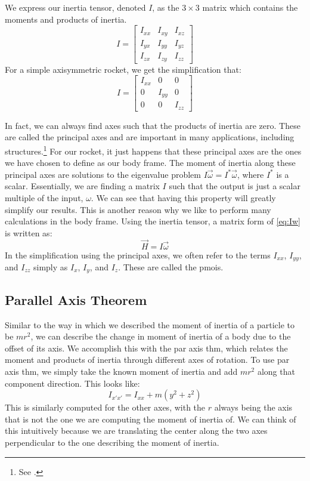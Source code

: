 \documentclass[10pt, openany, titlepage]{book}
\theoremstyle{definition}
\begin{document}
We express our \gls{inertia tensor}, denoted $I$, as the $3\times3$ matrix which contains the moments and products of inertia.
$$I=\begin{bmatrix}
    I_{xx}&I_{xy}&I_{xz}\\
    I_{yx}&I_{yy}&I_{yz}\\
    I_{zx}&I_{zy}&I_{zz}
\end{bmatrix}$$
For a simple axisymmetric rocket, we get the simplification that:
$$I=\begin{bmatrix}
    I_{xx}&0&0\\
    0&I_{yy}&0\\
    0&0&I_{zz}
\end{bmatrix}$$

In fact, we can always find axes such that the products of inertia are zero. These are called the \gls{principal axes} and are important in many applications, including structures.\footnote{See \cite{baker_statics_2020}.} For our rocket, it just happens that these \gls{principal axes} are the ones we have chosen to define as our \gls{body frame}. The \gls{moment of inertia} along these \gls{principal axes} are solutions to the eigenvalue problem $I\vec{\omega}=I^*\vec{\omega}$, where $I^*$ is a scalar. Essentially, we are finding a matrix $I$ such that the output is just a scalar multiple of the input, $\omega$. We can see that having this property will greatly simplify our results. This is another reason why we like to perform many calculations in the \gls{body frame}. Using the \gls{inertia tensor}, a matrix form of \eqref{eq:Iw}  is written as:
\begin{equation}\label{eq:IwVec}
    \vec{H}=I\vec{\omega}
\end{equation}
In the simplification using the \gls{principal axes}, we often refer to the terms $I_{xx}$, $I_{yy}$, and $I_{zz}$ simply as $I_x$, $I_y$, and $I_z$. These are called the \glspl{pmoi}.

\subsection{Parallel Axis Theorem}
Similar to the way in which we described the \gls{moment of inertia} of a particle to be $mr^2$, we can describe the change in \gls{moment of inertia} of a body due to the offset of its axis. We accomplish this with the \gls{par axis thm}, which relates the moment and products of inertia through different axes of rotation. To use \gls{par axis thm}, we simply take the known \gls{moment of inertia} and add $mr^2$ along that component direction. This looks like:
$$I_{x'x'}=I_{xx}+m\left(y^2+z^2\right)$$
This is similarly computed for the other axes, with the $r$ always being the axis that is not the one we are computing the \gls{moment of inertia} of. We can think of this intuitively because we are translating the center along the two axes perpendicular to the one describing the \gls{moment of inertia}.
\end{document}

